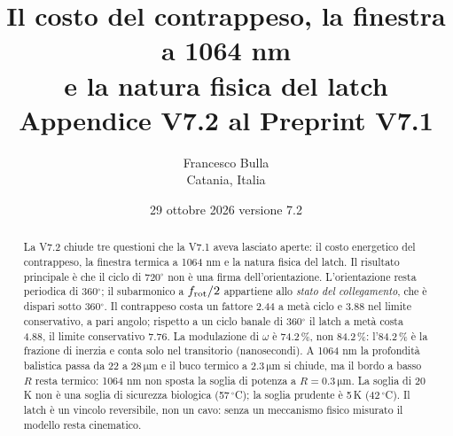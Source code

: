 \documentclass[11pt,a4paper]{article}
\title{\bfseries Il costo del contrappeso, la finestra a 1064 nm\\
e la natura fisica del latch\\[0.3em]
\large Appendice V7.2 al Preprint V7.1}
\author{Francesco Bulla\\ \small Catania, Italia}
\date{29 ottobre 2026 \quad \small versione 7.2}
\providecommand{\micro}{}
\renewcommand{\micro}{\ensuremath{\mathrm{\mu}}}
\begin{document}
\maketitle

\begin{abstract}
\noindent
La V7.2 chiude tre questioni che la V7.1 aveva lasciato aperte: il costo
energetico del contrappeso, la finestra termica a 1064 nm e la natura fisica
del latch. Il risultato principale è che il ciclo di 720$^\circ$ non è una
firma dell'orientazione. L'orientazione resta periodica di 360$^\circ$; il
subarmonico a $f_{\rm rot}/2$ appartiene allo \emph{stato del collegamento},
che è dispari sotto 360$^\circ$. Il contrappeso costa un fattore 2.44 a metà
ciclo e 3.88 nel limite conservativo, a pari angolo; rispetto a un ciclo
banale di 360$^\circ$ il latch a metà costa 4.88, il limite conservativo
7.76. La modulazione di $\omega$ è 74.2\,\%,
non 84.2\,\%: l'84.2\,\% è la frazione di inerzia e conta solo nel transitorio
(nanosecondi). A 1064 nm la profondità balistica passa da 22 a 28\,$\micro$m e
il buco termico a 2.3\,$\micro$m si chiude, ma il bordo a basso $R$ resta
termico: 1064 nm non sposta la soglia di potenza a $R=0.3\,\micro$m. La soglia
di 20\,K non è una soglia di sicurezza biologica (57\,$^\circ$C); la soglia
prudente è 5\,K (42\,$^\circ$C). Il latch è un vincolo reversibile, non un
cavo: senza un meccanismo fisico misurato il modello resta cinematico.
\end{abstract}
\end{document}
